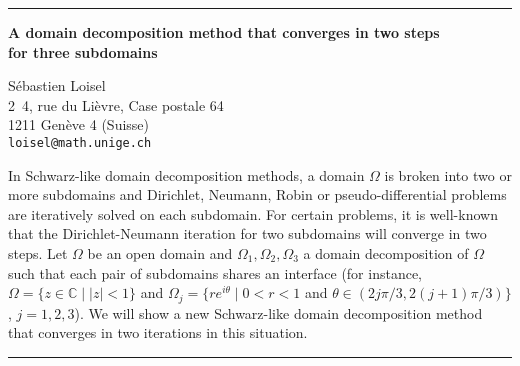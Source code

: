 \documentclass[twosided]{report}
\newcommand{\Cplex}{\mathbb{C}}
\begin{document}
	\begin{center} \rule{6in}{1pt} \end{center}

\begin{center}
{\large			%
{\bf A domain decomposition method that converges in two steps \\
	for three subdomains}}

	S\'ebastien Loisel \\
	2~4, rue du Li\`evre, Case postale 64 \\
	1211 Gen\`eve 4 (Suisse) \\
	{\tt loisel@math.unige.ch}
\end{center}
In Schwarz-like domain decomposition methods, a domain
$\Omega$ is broken into two or more subdomains and
Dirichlet, Neumann, Robin or pseudo-differential problems
are iteratively solved on each subdomain. For certain
problems, it is well-known that the Dirichlet-Neumann
iteration for two subdomains will converge in two steps. Let
$\Omega$ be an open domain and
$\Omega_{1},\Omega_{2},\Omega_{3}$ a domain decomposition of
$\Omega$ such that each pair of subdomains shares an
interface (for instance,
$\Omega=\{ z\in\Cplex \;|\; |z|<1\}$
and $\Omega_{j}=\{ re^{i\theta} \;|\; 0<r<1$ and
$\theta\in(2j\pi/3,2(j+1)\pi/3)\}$,
$j=1,2,3$).
We will show a new Schwarz-like domain decomposition
method that converges in two iterations in this situation.



	\begin{center} \rule{6in}{1pt} \end{center}
\end{document}
